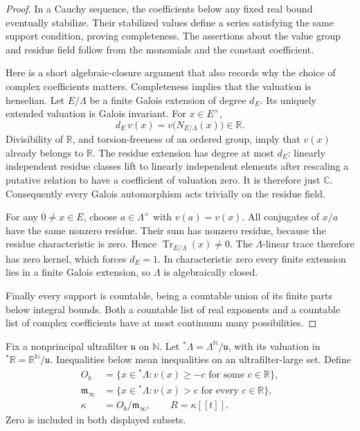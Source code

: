 \documentclass[11pt]{article}
\theoremstyle{definition}
\theoremstyle{remark}
\numberwithin{equation}{section}
\begin{document}
\begin{proof}
In a Cauchy sequence, the coefficients below any fixed real bound
eventually stabilize.  Their stabilized values define a series satisfying
the same support condition, proving completeness.  The assertions about
the value group and residue field follow from the monomials and the
constant coefficient.

Here is a short algebraic-closure argument that also records why the
choice of complex coefficients matters.  Completeness implies that the
valuation is henselian.  Let \(E/\Lambda\) be a finite Galois extension of
degree \(d_E\).  Its uniquely extended valuation is Galois invariant.
For \(x\in E^\times\),
\[
 d_E\,v(x)=v\bigl(N_{E/\Lambda}(x)\bigr)\in\mathbb R.
\]
Divisibility of \(\mathbb R\), and torsion-freeness of an ordered group, imply
that \(v(x)\) already belongs to \(\mathbb R\).  The residue extension has degree
at most \(d_E\): linearly independent residue classes lift to linearly
independent elements after rescaling a putative relation to have a
coefficient of valuation zero.  It is therefore just \(\mathbb C\).
Consequently every Galois automorphism acts trivially on the residue
field.

For any \(0\ne x\in E\), choose \(a\in\Lambda^\times\) with \(v(a)=v(x)\).
All conjugates of \(x/a\) have the same nonzero residue.  Their sum has
nonzero residue, because the residue characteristic is zero.  Hence
\(\operatorname{Tr}_{E/\Lambda}(x)\ne0\).  The \(\Lambda\)-linear trace
therefore has zero kernel, which forces \(d_E=1\).  In characteristic
zero every finite extension lies in a finite Galois extension, so
\(\Lambda\) is algebraically closed.

Finally every support is countable, being a countable union of its finite
parts below integral bounds.  Both a countable list of real exponents and
a countable list of complex coefficients have at most continuum many
possibilities.
\end{proof}

Fix a nonprincipal ultrafilter \(\mathfrak u\) on \(\mathbb N\).  Let
\({}^*\Lambda=\Lambda^{\mathbb N}/\mathfrak u\), with its valuation in
\({}^*\mathbb R=\mathbb R^{\mathbb N}/\mathfrak u\).  Inequalities below mean inequalities on
an ultrafilter-large set.  Define
\begin{align}
 O_b&=\{x\in{}^*\Lambda:v(x)\ge-c
                         \text{ for some }c\in\mathbb R\},\nonumber\\
 \mathfrak m_\infty&=\{x\in{}^*\Lambda:v(x)>c
                         \text{ for every }c\in\mathbb R\},\nonumber\\
 \kappa&=O_b/\mathfrak m_\infty,\qquad R=\kappa[[t]].
 \label{cat:coefficient-rings}
\end{align}
Zero is included in both displayed subsets.
\end{document}
